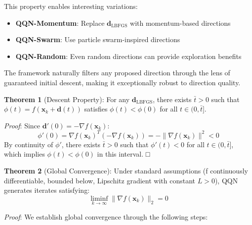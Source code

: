 This property enables interesting variations:

\begin{itemize}
\tightlist
\item
  \textbf{QQN-Momentum}: Replace \(\mathbf{d}_{\text{LBFGS}}\) with momentum-based directions
\item
  \textbf{QQN-Swarm}: Use particle swarm-inspired directions
\item
  \textbf{QQN-Random}: Even random directions can provide exploration benefits
\end{itemize}

The framework naturally filters any proposed direction through the lens of guaranteed initial descent, making it exceptionally robust to direction quality.

\textbf{Theorem 1} (Descent Property): For any \(\mathbf{d}_{\text{LBFGS}}\), there exists \(\bar{t} > 0\) such that \(\phi(t) = f(\mathbf{x}_k + \mathbf{d}(t))\) satisfies \(\phi(t) < \phi(0)\) for all \(t \in (0, \bar{t}]\).

\emph{Proof}: Since \(\mathbf{d}'(0) = -\nabla f(\mathbf{x}_k)\):
\[\phi'(0) = \nabla f(\mathbf{x}_k)^T (-\nabla f(\mathbf{x}_k)) = -\|\nabla f(\mathbf{x}_k)\|^2 < 0\]
By continuity of \(\phi'\), there exists \(\bar{t} > 0\) such that \(\phi'(t) < 0\) for all \(t \in (0, \bar{t}]\), which implies \(\phi(t) < \phi(0)\) in this interval. □

\textbf{Theorem 2} (Global Convergence): Under standard assumptions (f continuously differentiable, bounded below, Lipschitz
gradient with constant \(L > 0\)), QQN generates iterates satisfying:
\[\liminf_{k \to \infty} \|\nabla f(\mathbf{x}_k)\|_2 = 0\]

\emph{Proof}: We establish global convergence through the following steps:

